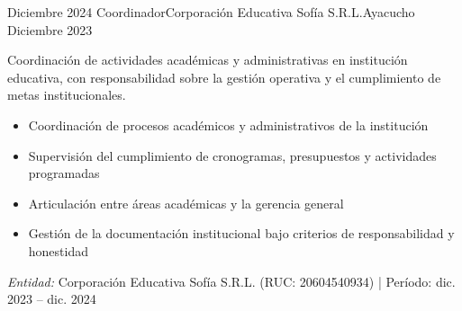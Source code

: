 \experience
{Diciembre 2024} {Coordinador}{Corporación Educativa Sofía S.R.L.}{Ayacucho}
{Diciembre 2023} {
	Coordinación de actividades académicas y administrativas en institución educativa, con responsabilidad sobre la gestión operativa y el cumplimiento de metas institucionales.
	\begin{itemize}
		\item Coordinación de procesos académicos y administrativos de la institución
		\item Supervisión del cumplimiento de cronogramas, presupuestos y actividades programadas
		\item Articulación entre áreas académicas y la gerencia general
		\item Gestión de la documentación institucional bajo criterios de responsabilidad y honestidad
	\end{itemize}
}
{\footnotesize{\emph{Entidad:} Corporación Educativa Sofía S.R.L. (RUC: 20604540934) | Período: dic. 2023 -- dic. 2024}}
